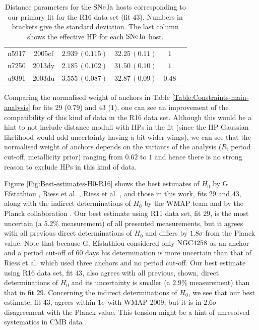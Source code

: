 \begin{table}[tbp]
\begin{tabular}{@{}lccccr}
 n5917 & 2005cf & $2.939\,(0.115)$& $32.25\,(0.11)$& $ 1$ \\
       
 n7250 & 2013dy & $2.185\,(0.102)$& $31.50\,(0.10)$& $ 1$ \\
        
 u9391 & 2003du & $3.555\,(0.087)$& $32.87\,(0.09)$& $ 0.48$ \\
         
\hline
\end{tabular}
\caption{\label{Table:SNIa-HP-fit-43} Distance parameters for the $\mathrm{SNe\,Ia}$ hosts corresponding to our primary fit for the R16 data set (fit $43$). Numbers in brackets give the standard deviation. The last column shows the effective HP for each $\mathrm{SNe\,Ia}$ host.}
\end{table}

Comparing the normalised weight of anchors in Table \ref{Table:Constraints-main-analysis} for fits $29$ ($0.79$) and $43$ ($1$), one can see an improvement of the compatibility of this kind of data in the R16 data set. Although this would be a hint to not include distance moduli with HPs in the fit (since the HP Gaussian likelihood would add uncertainty having a bit wider wings), we can see that the normalised weight of anchors depends on the variants of the analysis ($R$, period cut-off, metallicity prior) ranging from $0.62$ to $1$ and hence there is no strong reason to exclude HPs in this kind of data. 

Figure \ref{Fig:Best-estimates-H0-R16} shows the best estimates of $H_0$ by G. Efstathiou \cite{Efstathiou:2013via}, Riess et al. \cite{Riess:2011yx}, Riess et al. \cite{Riess:2016jrr}, and those in this work, fits $29$ and $43$, along with the indirect determinations of $H_0$ by the WMAP team \cite{Hinshaw:2012aka} and by the Planck collaboration \cite{Ade:2015xua}. Our best estimate using R11 data set, fit $29$, is the most uncertain (a $5.2\%$ measurement) of all presented measurements, but it agrees with all previous direct determinations of $H_0$ and differs by $1.8\sigma$ from the Planck value. Note that because G. Efstathiou considered only $\mathrm{NGC4258}$ as an anchor and a period cut-off of $60$ days his determination is more uncertain than that of Riess et al. \cite{Riess:2011yx} which used three anchors and no period cut-off. Our best estimate using R16 data set, fit $43$, also agrees with all previous, shown, direct determinations of $H_0$ and its uncertainty is smaller (a $2.9\%$ measurement) than that in fit $29$. Concerning the indirect determinations of $H_0$, we see that our best estimate, fit $43$, agrees within $1\sigma$ with WMAP 2009, but it is in $2.6\sigma$ disagreement with the Planck value. This tension might be a hint of unresolved systematics in CMB data \cite{Riess:2016jrr}. 

